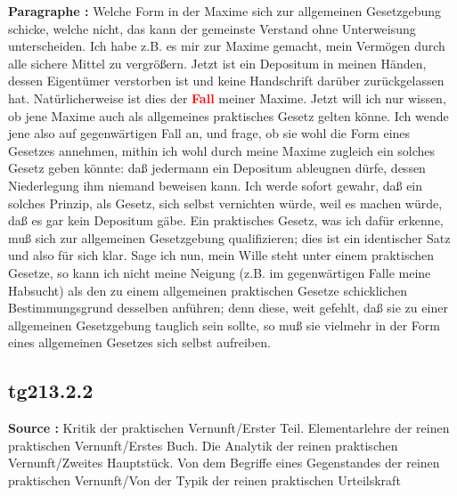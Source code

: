 \documentclass[a4paper,12pt,twoside]{book}
\newcommand{\match}[1]{\textcolor{red}{\textbf{#1}}}
\begin{document}
	\noindent\textbf{Paragraphe : }Welche Form in der Maxime sich zur allgemeinen Gesetzgebung schicke, welche nicht, das kann der gemeinste Verstand ohne Unterweisung unterscheiden. Ich habe z.B. es mir zur Maxime gemacht, mein Vermögen durch alle sichere Mittel zu vergrößern. Jetzt ist ein Depositum in meinen Händen, dessen Eigentümer verstorben ist und keine Handschrift darüber zurückgelassen hat. Natürlicherweise ist dies der \match{Fall} meiner Maxime. Jetzt will ich nur wissen, ob jene Maxime auch als allgemeines praktisches Gesetz gelten könne. Ich wende jene also auf gegenwärtigen Fall an, und frage, ob sie wohl die Form eines Gesetzes annehmen, mithin ich wohl durch meine Maxime zugleich ein solches Gesetz geben könnte: daß jedermann ein Depositum ableugnen dürfe, dessen Niederlegung ihm niemand beweisen kann. Ich werde sofort gewahr, daß ein solches Prinzip, als Gesetz, sich selbst vernichten würde, weil es machen würde, daß es gar kein Depositum gäbe. Ein praktisches Gesetz, was ich dafür erkenne, muß sich zur allgemeinen Gesetzgebung qualifizieren; dies ist ein identischer Satz und also für sich klar. Sage ich nun, mein Wille steht unter einem praktischen Gesetze, so kann ich nicht meine Neigung (z.B. im gegenwärtigen Falle meine Habsucht) als den zu einem allgemeinen praktischen Gesetze schicklichen Bestimmungsgrund desselben anführen; denn diese, weit gefehlt, daß sie zu einer allgemeinen Gesetzgebung tauglich sein sollte, so muß sie vielmehr in der Form eines allgemeinen Gesetzes sich selbst aufreiben. 
	
	\subsection*{tg213.2.2} 
	\textbf{Source : }Kritik der praktischen Vernunft/Erster Teil. Elementarlehre der reinen praktischen Vernunft/Erstes Buch. Die Analytik der reinen praktischen Vernunft/Zweites Hauptstück. Von dem Begriffe eines Gegenstandes der reinen praktischen Vernunft/Von der Typik der reinen praktischen Urteilskraft\\  
	
\end{document}
